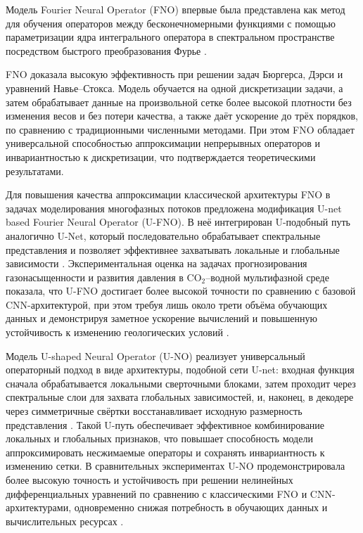 \documentclass[12pt]{article}
\begin{document}
 
Модель Fourier Neural Operator (FNO) впервые была представлена как метод для обучения операторов между бесконечномерными функциями с помощью параметризации ядра интегрального оператора в спектральном пространстве посредством быстрого преобразования Фурье \cite{fno1}. 

FNO доказала высокую эффективность при решении задач Бюргерса, Дэрси и уравнений Навье–Стокса. Модель обучается на одной дискретизации задачи, а затем обрабатывает данные на произвольной сетке более высокой  плотности без изменения весов и без потери качества, а также даёт ускорение до трёх порядков, по сравнению с традиционными численными методами\cite{fno1}. При этом FNO обладает универсальной способностью аппроксимации непрерывных операторов и инвариантностью к дискретизации, что подтверждается теоретическими результатами\cite{fno2}.


Для повышения качества аппроксимации классической архитектуры FNO в задачах моделирования многофазных потоков предложена модификация  U-net based Fourier Neural Operator (U-FNO). В неё интегрирован U-подобный путь аналогично U-Net, который последовательно обрабатывает спектральные представления и позволяет эффективнее захватывать локальные и глобальные зависимости \cite{ufno1}. Экспериментальная оценка на задачах прогнозирования газонасыщенности и развития давления в CO$_2$–водной мультифазной среде показала, что U-FNO достигает более высокой точности по сравнению с базовой CNN-архитектурой, при этом требуя лишь около трети объёма обучающих данных и демонстрируя заметное ускорение вычислений и повышенную устойчивость к изменению геологических условий \cite{ufno1}.

Модель U-shaped Neural Operator (U-NO) реализует универсальный операторный подход в виде архитектуры, подобной сети U-net: входная функция сначала обрабатывается локальными сверточными блоками, затем проходит через спектральные слои для захвата глобальных зависимостей, и, наконец, в декодере через симметричные свёртки восстанавливает исходную размерность представления \cite{uno1}. Такой U-путь обеспечивает эффективное комбинирование локальных и глобальных признаков, что повышает способность модели аппроксимировать несжимаемые операторы и сохранять инвариантность к изменению сетки. В сравнительных экспериментах U-NO продемонстрировала более высокую точность и устойчивость при решении нелинейных дифференциальных уравнений по сравнению с классическими FNO и CNN-архитектурами, одновременно снижая потребность в обучающих данных и вычислительных ресурсах \cite{uno1}.
\end{document}

